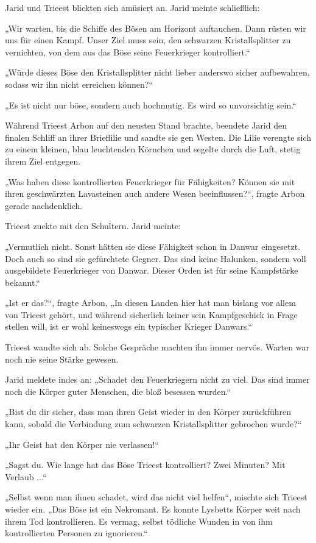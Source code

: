 Jarid und Trieest blickten sich amüsiert an. Jarid meinte schließlich:

„Wir warten, bis die Schiffe des Bösen am Horizont auftauchen. Dann rüsten wir uns für einen Kampf. Unser Ziel muss sein, den schwarzen Kristallsplitter zu vernichten, von dem aus das Böse seine Feuerkrieger kontrolliert.“

„Würde dieses Böse den Kristallsplitter nicht lieber anderswo sicher aufbewahren, sodass wir ihn nicht erreichen können?“

„Es ist nicht nur böse, sondern auch hochmutig. Es wird so unvorsichtig sein.“

Während Trieest Arbon auf den neusten Stand brachte, beendete Jarid den finalen Schliff an ihrer Brieflilie und sandte sie gen Westen. Die Lilie verengte sich zu einem kleinen, blau leuchtenden Körnchen und segelte durch die Luft, stetig ihrem Ziel entgegen.

„Was haben diese kontrollierten Feuerkrieger für Fähigkeiten? Können sie mit ihren geschwärzten Lavasteinen auch andere Wesen beeinflussen?“, fragte Arbon gerade nachdenklich.

Trieest zuckte mit den Schultern. Jarid meinte:

„Vermutlich nicht. Sonst hätten sie diese Fähigkeit schon in Danwar eingesetzt. Doch auch so sind sie gefürchtete Gegner. Das sind keine Halunken, sondern voll ausgebildete Feuerkrieger von Danwar. Dieser Orden ist für seine Kampfstärke bekannt.“

„Ist er das?“, fragte Arbon, „In diesen Landen hier hat man bislang vor allem von Trieest gehört, und während sicherlich keiner sein Kampfgeschick in Frage stellen will, ist er wohl keineswegs ein typischer Krieger Danwars.“

Trieest wandte sich ab. Solche Gespräche machten ihn immer nervös. Warten war noch nie seine Stärke gewesen.

Jarid meldete indes an: „Schadet den Feuerkriegern nicht zu viel. Das sind immer noch die Körper guter Menschen, die bloß besessen wurden.“

„Bist du dir sicher, dass man ihren Geist wieder in den Körper zurückführen kann, sobald die Verbindung zum schwarzen Kristallsplitter gebrochen wurde?“

„Ihr Geist hat den Körper nie verlassen!“

„Sagst du. Wie lange hat das Böse Trieest kontrolliert? Zwei Minuten? Mit Verlaub ...“

„Selbst wenn man ihnen schadet, wird das nicht viel helfen“, mischte sich Trieest wieder ein. „Das Böse ist ein Nekromant. Es konnte Lysbetts Körper weit nach ihrem Tod kontrollieren. Es vermag, selbst tödliche Wunden in von ihm kontrollierten Personen zu ignorieren.“


